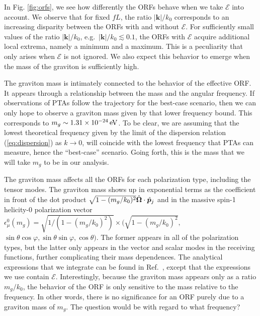 \documentclass[prd,twocolumn,aps,psfig,nofootinbib,nobibnotes,superscriptaddress,preprintnumbers,times]{revtex4-2}
\newcommand{\eV}{\,{\rm eV}}
\begin{document}
In Fig. \ref{fig:orfs}, we see how differently the ORFs behave when we take $\mathcal{E}$ into account. We observe that for fixed $fL$, the ratio $|\boldsymbol{k}|/k_0$ corresponds to an increasing disparity between the ORFs with and without $\mathcal{E}$. For sufficiently small values of the ratio $|\boldsymbol{k}|/k_0$, e.g.\ $|\boldsymbol{k}|/k_0 \lesssim 0.1$, the ORFs with $\mathcal{E}$ acquire additional local extrema, namely a minimum and a maximum. This is a peculiarity that only arises when $\mathcal{E}$ is not ignored. We also expect this behavior to emerge when the mass of the graviton is sufficiently high.

The graviton mass is intimately connected to the behavior of the effective ORF. It appears through a relationship between the mass and the angular frequency. 
If observations of PTAs follow the trajectory for the best-case scenario, then we can only hope to observe a graviton mass given by that lower frequency bound. This corresponds to $m_g \sim 1.31\times 10^{-24} \eV$. To be clear, we are assuming that the lowest theoretical frequency given by the limit of the dispersion relation (\ref{eq:dispersion}) as $k\rightarrow 0$, will coincide with the lowest frequency that PTAs can measure, hence the ``best-case'' scenario. Going forth, this is the mass that we will take $m_g$ to be in our analysis.

The graviton mass affects all the ORFs for each polarization type, including the tensor modes. The graviton mass shows up in exponential terms as the coefficient in front of the dot product $\sqrt{1 - (m_g/k_0)^2}\hat{\bf \Omega}\cdot \hat{\boldsymbol{p}}_j$ and in the massive spin-1 helicity-0 polarization vector $\epsilon_\mu^0(m_g) = \sqrt{1 / (1 - (m_g/k_0)^2)}\times (\sqrt{1 - (m_g/k_0)^2},$ $\sin\theta\cos\varphi, \sin\theta\sin\varphi, \cos\theta)$. The former appears in all of the polarization types, but the latter only appears in the vector and scalar modes in the receiving functions, further complicating their mass dependences. The analytical expressions that we integrate can be found in Ref.~\cite{Liang:2021bct}, except that the expressions we use contain $\mathcal{E}$. Interestingly, because the graviton mass appears only as a ratio $m_g / k_0$, the behavior of the ORF is only sensitive to the mass relative to the frequency. In other words, there is no significance for an ORF purely due to a graviton mass of $m_g$. The question would be with regard to what frequency?
\end{document}
